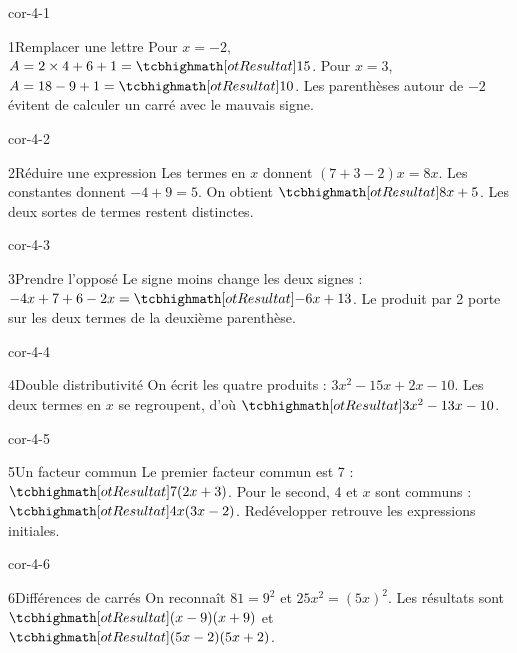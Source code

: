 \clearpage\pagestyle{otMain}\fontsize{11}{15}\selectfont{}
\begin{blocLivre}{cor-4-1}\begin{corrige}{1}{Remplacer une lettre}
Pour $x=-2$, $A=2\times4+6+1=\res{15}$. Pour $x=3$, $A=18-9+1=\res{10}$. Les parenthèses autour de $-2$ évitent de calculer un carré avec le mauvais signe.
\end{corrige}\end{blocLivre}
\begin{blocLivre}{cor-4-2}\begin{corrige}{2}{Réduire une expression}
Les termes en $x$ donnent $(7+3-2)x=8x$. Les constantes donnent $-4+9=5$. On obtient $\res{8x+5}$. Les deux sortes de termes restent distinctes.
\end{corrige}\end{blocLivre}
\begin{blocLivre}{cor-4-3}\begin{corrige}{3}{Prendre l’opposé}
Le signe moins change les deux signes : $-4x+7+6-2x=\res{-6x+13}$. Le produit par 2 porte sur les deux termes de la deuxième parenthèse.
\end{corrige}\end{blocLivre}
\begin{blocLivre}{cor-4-4}\begin{corrige}{4}{Double distributivité}
On écrit les quatre produits : $3x^2-15x+2x-10$. Les deux termes en $x$ se regroupent, d’où $\res{3x^2-13x-10}$.
\end{corrige}\end{blocLivre}
\begin{blocLivre}{cor-4-5}\begin{corrige}{5}{Un facteur commun}
Le premier facteur commun est 7 : $\res{7(2x+3)}$. Pour le second, 4 et $x$ sont communs : $\res{4x(3x-2)}$. Redévelopper retrouve les expressions initiales.
\end{corrige}\end{blocLivre}
\begin{blocLivre}{cor-4-6}\begin{corrige}{6}{Différences de carrés}
On reconnaît $81=9^2$ et $25x^2=(5x)^2$. Les résultats sont $\res{(x-9)(x+9)}$ et $\res{(5x-2)(5x+2)}$.
\end{corrige}\end{blocLivre}
